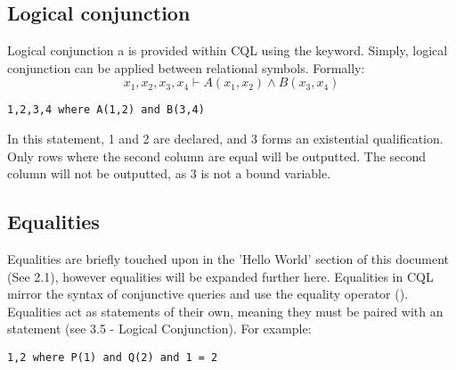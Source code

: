 \subsection{Logical conjunction}
Logical conjunction a is provided within CQL using the  keyword. Simply, logical conjunction can be applied between relational symbols. Formally:
$$x_1, x_2, x_3, x_4 \vdash A(x_1, x_2)  \land B(x_3, x_4)$$

\begin{lstlisting}[style=framed]
1,2,3,4 where A(1,2) and B(3,4)
\end{lstlisting}

In this statement, 1 and 2 are declared, and 3 forms an existential qualification. Only rows where the second column are equal will be outputted. The second column will not be outputted, as 3 is not a bound variable. 

\subsection{Equalities}
Equalities are briefly touched upon in the 'Hello World' section of this document (See 2.1), however equalities will be expanded further here. Equalities in CQL mirror the syntax of conjunctive queries and use the equality operator (\codeword{=}). Equalities act as statements of their own, meaning they must be paired with an  statement (see 3.5 - Logical Conjunction). For example:
\begin{lstlisting}[style=framed]
1,2 where P(1) and Q(2) and 1 = 2
\end{lstlisting}

